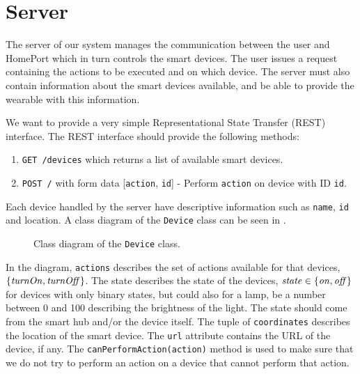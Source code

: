 \section{Server}\label{sec:serverdesign}
The server of our system manages the communication between the user and HomePort which in turn controls the smart devices.
The user issues a request containing the actions to be executed and on which device. 
The server must also contain information about the smart devices available,
and be able to provide the wearable with this information. 

We want to provide a very simple Representational State Transfer (REST) interface.
The REST interface should provide the following methods:

\begin{enumerate}
  \item \texttt{GET /devices} which returns a list of available smart devices.
  \item \texttt{POST /} with form data [\texttt{action}, \texttt{id}] - Perform \texttt{action} on device with ID \texttt{id}.
\end{enumerate}

Each device handled by the server have descriptive information such as \texttt{name}, \texttt{id} and location. 
A class diagram of the \texttt{Device} class can be seen in .

\begin{figure}[!htb]
  \centering
  \label{fig:deviceclass}
  \caption{Class diagram of the \texttt{Device} class.}
\end{figure}

In the diagram, \texttt{actions} describes the set of actions available for that devices, \eg $\{\var{turnOn}, \var{turnOff}\}$. 
The state describes the state of the devices, 
\eg $\var{state} \in \{\var{on}, \var{off}\}$ for devices with only binary states, 
but could also for a lamp, be a number between \num{0} and \num{100} describing the brightness of the light. 
The state should come from the smart hub and/or the device itself. 
The tuple of \texttt{coordinates} describes the location of the smart device. 
The \texttt{url} attribute contains the URL of the device, if any. 
The \texttt{canPerformAction(action)} method is used to make sure that we do not try to perform an action on a device that cannot perform that action. 


